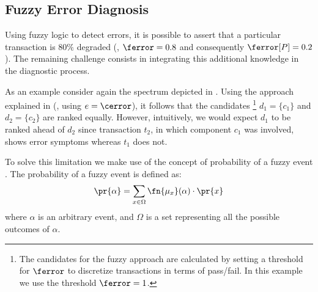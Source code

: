 \subsection{Fuzzy Error Diagnosis}
\label{sec:fuzzinel:approach:fuzzy-error-diagnosis}
Using fuzzy logic to detect errors, it is possible to assert that a
particular transaction is $80\%$ degraded (\ie,
$\ferror=0.8$ and consequently $\ferror[P]=0.2$).
%
The remaining challenge consists in integrating this additional
knowledge in the diagnostic process.

As an example consider again the spectrum depicted in
.
%
Using the approach explained in 
(\ie, using $e = \cerror$), it follows that the
candidates%
%
\footnote{The candidates for the fuzzy approach are calculated by
  setting a threshold for $\ferror$ to discretize transactions in
  terms of pass/fail. In this example we use the threshold $\ferror =
  1$.}
%
$d_1 = \{c_1\}$ and $d_2= \{c_2\}$ are
ranked equally.
%
However, intuitively, we would expect $d_1$ to be ranked ahead of
$d_2$ since transaction $t_2$, in which component $c_1$ was involved,
shows error symptoms whereas $t_1$ does not.

To solve this limitation we make use of the concept of
probability of a fuzzy event \citep{Zadeh68}.
%
The probability of a fuzzy event is defined as:
\begin{equation}
  \pr{\alpha} = \sum_{x\in\Omega}{\fn{\mu_x}(\alpha) \cdot \pr{x}}
\end{equation}
\noindent where $\alpha$ is an arbitrary event, and $\Omega$ is a set
representing all the possible outcomes of $\alpha$.


